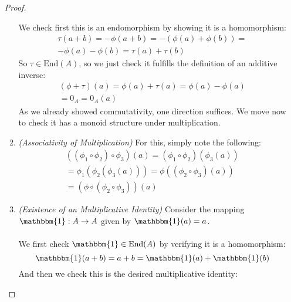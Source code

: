 \documentclass[12pt]{article}
\newenvironment{ex}[2][Exercise]{\begin{trivlist}
\item[\hskip \labelsep {\bfseries #1}\hskip \labelsep {\bfseries #2.}]}{\end{trivlist}}
\begin{document}
\begin{ex}{3}
\begin{enumerate}[label=(\alph*)]
\begin{proof}
\begin{enumerate}
            We check first this is an endomorphism by showing it is a homomorphism:
            \begin{equation}
                \begin{aligned}
                \tau(a + b) = -\phi(a + b) = -(\phi(a) + \phi(b)) = \\
                -\phi(a) - \phi(b) = \tau(a) + \tau(b)
                \end{aligned}
            \end{equation}
            So $\tau \in \text{End}(A)$, so we just check it fulfills the definition of an additive inverse:
            \begin{equation}
                \begin{aligned}
                    (\phi + \tau)(a) = \phi(a) + \tau(a) = \phi(a) - \phi (a) \\
                    = 0_A = 0_A(a)
                \end{aligned}
            \end{equation}
            As we already showed commutativity, one direction suffices. We move now to check it has a monoid structure under multiplication.
            \item \textit{(Associativity of Multiplication)} For this, simply note the following:
            \begin{equation}
                \begin{aligned}
                    ((\phi_1 \circ \phi_2) \circ \phi_3)(a) = (\phi_1 \circ \phi_2)(\phi_3(a)) 
                    \\ = \phi_1(\phi_2(\phi_3(a))) = \phi((\phi_2 \circ \phi_3)(a)) \\
                    = (\phi \circ (\phi_2 \circ \phi_3))(a)
                \end{aligned}
            \end{equation}
            \item \textit{(Existence of an Multiplicative Identity)} Consider the mapping $\mathbbm{1} : A \rightarrow A$ given by $\mathbbm{1}(a) = a$. \\ \\
            We first check $\mathbbm{1} \in \text{End}(A)$ by verifying it is a homomorphism:
            \begin{equation}
                \mathbbm{1}(a + b) = a + b = \mathbbm{1}(a) + \mathbbm{1}(b)
            \end{equation}
            And then we check this is the desired multiplicative identity:

\end{enumerate}
\end{proof}
\end{enumerate}
\end{ex}
\end{document}
